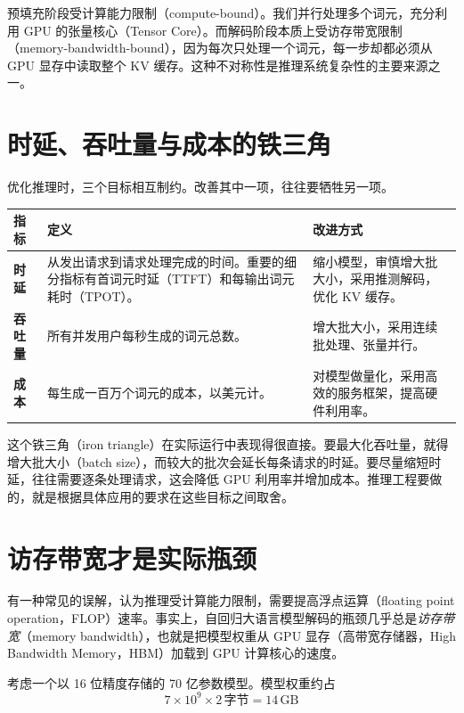 预填充阶段受计算能力限制（compute-bound）。我们并行处理多个词元，充分利用 GPU 的张量核心（Tensor Core）。而解码阶段本质上受访存带宽限制（memory-bandwidth-bound），因为每次只处理一个词元，每一步却都必须从 GPU 显存中读取整个 KV 缓存。这种不对称性是推理系统复杂性的主要来源之一。

\section{时延、吞吐量与成本的铁三角}

优化推理时，三个目标相互制约。改善其中一项，往往要牺牲另一项。

\begin{center}
\begin{tabularx}{0.93\linewidth}{@{}l>{\raggedright\arraybackslash}X>{\raggedright\arraybackslash}X@{}}
\toprule
\textbf{指标} & \textbf{定义} & \textbf{改进方式} \\
\midrule
\textbf{时延} & 从发出请求到请求处理完成的时间。重要的细分指标有首词元时延（TTFT）和每输出词元耗时（TPOT）。 & 缩小模型，审慎增大批大小，采用推测解码，优化 KV 缓存。 \\
\textbf{吞吐量} & 所有并发用户每秒生成的词元总数。 & 增大批大小，采用连续批处理、张量并行。 \\
\textbf{成本} & 每生成一百万个词元的成本，以美元计。 & 对模型做量化，采用高效的服务框架，提高硬件利用率。 \\
\bottomrule
\end{tabularx}
\end{center}

这个铁三角（iron triangle）在实际运行中表现得很直接。要最大化吞吐量，就得增大批大小（batch size），而较大的批次会延长每条请求的时延。要尽量缩短时延，往往需要逐条处理请求，这会降低 GPU 利用率并增加成本。推理工程要做的，就是根据具体应用的要求在这些目标之间取舍。

\section{访存带宽才是实际瓶颈}

有一种常见的误解，认为推理受计算能力限制，需要提高浮点运算（floating point operation，FLOP）速率。事实上，自回归大语言模型解码的瓶颈几乎总是\emph{访存带宽}（memory bandwidth），也就是把模型权重从 GPU 显存（高带宽存储器，High Bandwidth Memory，HBM）加载到 GPU 计算核心的速度。

考虑一个以 16 位精度存储的 70 亿参数模型。模型权重约占
\[
7\times10^9\times2\,\text{字节}=14\,\mathrm{GB}
\]


